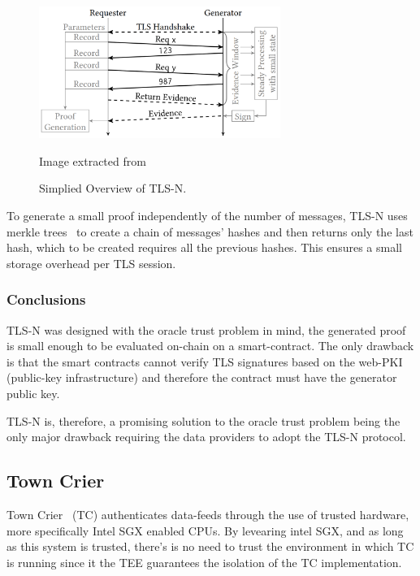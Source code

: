 \begin{figure}[h]
    \begin{center}
      \leavevmode
      \includegraphics[width=0.7\textwidth]{figures/tlsn-normal-flow.PNG}
      \caption{Simplied Overview of TLS-N.}{Image extracted from \citet{Ritzdorf2017a}}
      \label{fig:/figures/tlsn-normal-flow}
    \end{center}
\end{figure}

To generate a small proof independently of the number of messages, TLS-N uses merkle trees~\cite{MerkleTrees} to create a chain of messages' hashes and then returns only the last hash, which to be created requires all the previous hashes. This ensures a small storage overhead per TLS session.


\subsubsection{Conclusions}
TLS-N was designed with the oracle trust problem in mind, the generated proof is small enough to be evaluated on-chain on a smart-contract. The only drawback is that the smart contracts cannot verify TLS signatures based on the web-PKI (public-key infrastructure) and therefore the contract must have the generator public key.

TLS-N is, therefore, a promising solution to the oracle trust problem being the only major drawback requiring the data providers to adopt the TLS-N protocol.


\subsection{Town Crier}

Town Crier~\citet{Zhang2016a} (TC) authenticates data-feeds through the use of trusted hardware, more specifically Intel SGX enabled CPUs. By levearing intel SGX, and as long as this system is trusted, there's is no need to trust the environment in which TC is running since it the TEE guarantees the isolation of the TC implementation.

